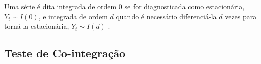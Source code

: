 \documentclass[a4paper, article, 12pt, openany, oneside, english, brazil]{abntex2}
\numberwithin{equation}{section}
\begin{document}
    Uma série é dita integrada de ordem 0 se for diagnosticada como estacionária, $ Y_t \sim I(0) $, e integrada de ordem $ d $ quando é necessário diferenciá-la $ d $ vezes para torná-la estacionária, $ Y_t \sim I(d) $ \cite[p.~740]{gujarati}.

   \subsection{Teste de Co-integração}





\newpage

\end{document}
